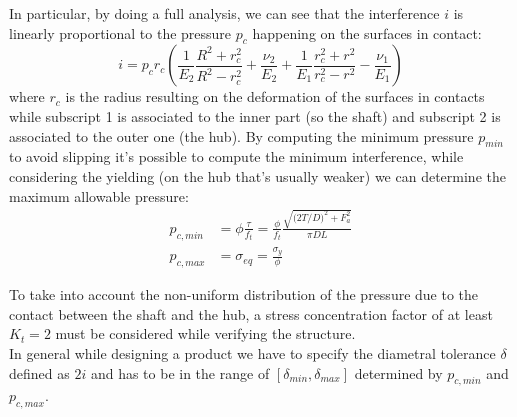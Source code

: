 \begin{multicols}
		In particular, by doing a full analysis, we can see that the interference $i$ is linearly proportional to the pressure $p_c$ happening on the surfaces in contact:
		\[ i = p_c r_c \left( \frac 1 {E_2} \frac{R^2+r_c^2}{R^2-r_c^2} + \frac{\nu_2}{E_2} + \frac{1}{E_1}  \frac{r_c^2 + r^2}{r_c^2 - r^2} - \frac{\nu_1}{E_1}\right) \]
		where $r_c$ is the radius resulting on the deformation of the surfaces in contacts while subscript 1 is associated to the inner part (so the shaft) and subscript 2 is associated to the outer one (the hub). By computing the minimum pressure $p_{min}$ to avoid slipping it's possible to compute the minimum interference, while considering the yielding (on the hub that's usually weaker) we can determine the maximum allowable pressure:
		\begin{equation}
		\begin{split}
			p_{c,min} & = \phi \frac \tau {f_t} = \frac{\phi}{f_t} \frac{\sqrt{\big(2 T/D\big)^2 + F_a^2}}{\pi DL} \\
			p_{c,max} & = \sigma_{eq} = \frac{\sigma_y}{\phi}
		\end{split}
		\end{equation}
		
		To take into account the non-uniform distribution of the pressure due to the contact between the shaft and the hub, a stress concentration factor of at least $K_t = 2$ must be considered while verifying the structure.\\
		In general while designing a product we have to specify the diametral tolerance $\delta$ defined as $2i$ and has to be in the range of $[\delta_{min},\delta_{max}]$ determined by $p_{c,min}$ and $p_{c,max}$.
		
		
		
	
	
	
	
	
	
	
	
	
	
	
	
	
	
	
	
	
	
	
	
	
	
	
	
	
	
	
	
	
	
	
	
	
	
	
	
	
	
	
	

\end{multicols}